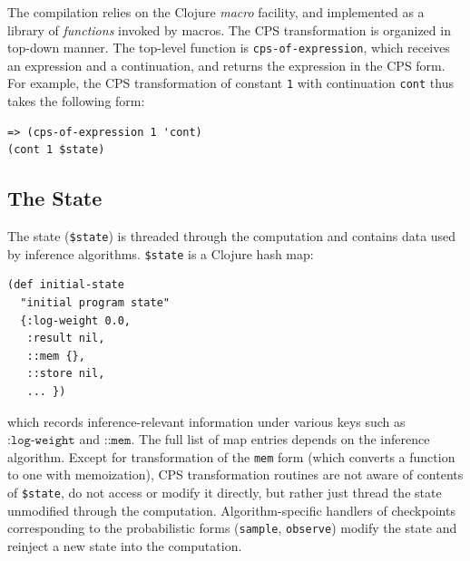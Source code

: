 \documentclass[preprint]{sigplanconf}
\begin{document}
The compilation relies on the Clojure \textit{macro} facility,
and implemented as a library of
\textit{functions}\iftoggle{full}{ in namespace
\texttt{anglican.trap}, which are}{} invoked by macros.  The CPS
transformation is organized in top-down manner.  The top-level
function is  \texttt{cps-of-expression}, which receives an
expression and a continuation, and returns the expression in the
CPS form. For example, the CPS transformation of constant
\texttt{1} with continuation \texttt{cont} thus takes the
following form:
\begin{lstlisting}[style=default]
=> (cps-of-expression 1 'cont)
(cont 1 $state)
\end{lstlisting}

\subsection {The State}
\label{sec:state}

The state (\texttt{\$state}) is threaded through the computation
and contains data used by inference algorithms. \texttt{\$state}
is a Clojure hash map:
\begin{lstlisting}[style=default]
(def initial-state
  "initial program state"
  {:log-weight 0.0,
   :result nil,
   ::mem {},
   ::store nil,
   ... })
\end{lstlisting}
which records inference-relevant information under various keys
such as $\texttt{:log-weight}$ and $\texttt{::mem}$.
The full list of map entries depends on the inference
algorithm. Except for transformation of
the \texttt{mem} form (which converts a function to one with memoization), 
CPS transformation routines
are not aware of contents of \texttt{\$state}, do not access or
modify it directly, but rather just thread the state unmodified
through the computation. Algorithm-specific handlers of
checkpoints corresponding to the probabilistic forms
(\texttt{sample}, \texttt{observe}) modify the
state and reinject a new state into the computation.

\iftoggle{full}{%

}{%
}%

\iftoggle{full}{%
\subsection{Implementation Highlights}
\label{seq:highlights}

So far we introduced the basics of Anglican compilation to
Clojure. The described approaches and techniques are important
for grasping the language implementation but relatively well-known.
In the rest of the section we focus on challenges we met and
resolved while implementing Anglican, as well as on
implementation of unique features of Anglican as a probabilistic
programming language.
}{%
}%
\end{document}
